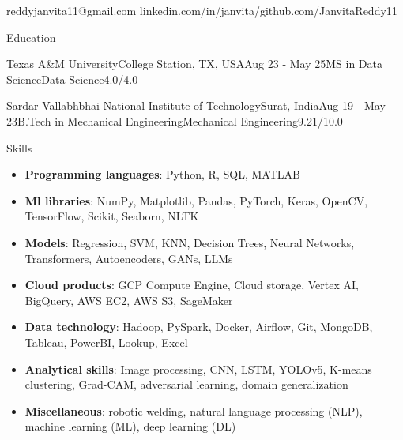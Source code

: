 \documentclass{resume}
\begin{document}
 {reddyjanvita11@gmail.com} {linkedin.com/in/janvita/}{github.com/JanvitaReddy11}
\begin{rSection}{Education}

\begin{rSubsectionedu}{Texas A\&M University}{College Station, TX, USA}{Aug 23 - May 25}{MS in Data Science}{Data Science}{4.0/4.0}

\end{rSubsectionedu}
\vspace{-15pt}

\begin{rSubsectionedu}{Sardar Vallabhbhai National Institute of Technology}{Surat, India}{Aug 19 - May 23}{B.Tech in Mechanical Engineering}{Mechanical Engineering}{9.21/10.0}

\end{rSubsectionedu}
\vspace{-15pt}
\end{rSection}
\begin{rSection}{Skills}
\begin{itemize}[left=0pt, label={}, align=parleft]
\vspace{-5pt}
\item [] \textbf{Programming languages}: {Python}, {R}, {SQL}, {MATLAB}
\vspace{-5pt}
\item [] \textbf{Ml libraries}: {NumPy}, {Matplotlib}, {Pandas}, {PyTorch}, {Keras}, {OpenCV}, {TensorFlow}, {Scikit}, {Seaborn}, {NLTK}
\vspace{-5pt}
\item [] \textbf{Models}: {Regression}, {SVM}, {KNN}, {Decision Trees}, {Neural Networks}, {Transformers}, {Autoencoders}, {GANs}, {LLMs}
\vspace{-5pt}
\item [] \textbf{Cloud products}: {GCP Compute Engine}, {Cloud storage}, {Vertex AI}, {BigQuery}, {AWS EC2}, {AWS S3}, {SageMaker}
\vspace{-5pt}
\item [] \textbf{Data technology}: {Hadoop}, {PySpark}, {Docker}, {Airflow}, {Git}, {MongoDB}, {Tableau}, {PowerBI}, {Lookup}, {Excel}
\vspace{-5pt}
\item [] \textbf{Analytical skills}: {Image processing}, {CNN}, {LSTM}, {YOLOv5}, {K-means clustering}, {Grad-CAM}, {adversarial learning}, {domain generalization}
\vspace{-5pt}
\item [] \textbf{Miscellaneous}: {robotic welding}, {natural language processing (NLP)}, {machine learning (ML)}, {deep learning (DL)}
\end{itemize}
\end{rSection}
\end{document}
